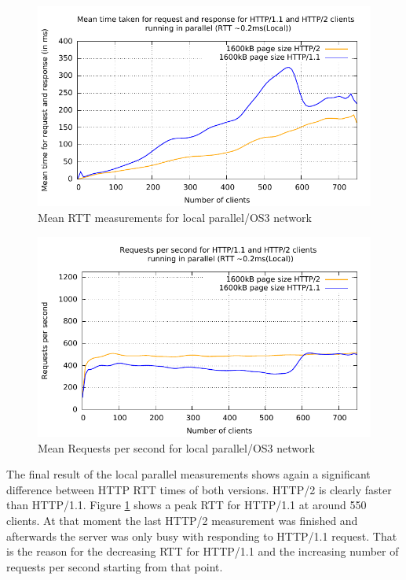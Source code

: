 \begin{figure}[H]
	\centering
	\includegraphics[scale=1,trim=0.0cm .0cm .0cm .0cm,clip]{images/latency-localv1vsv2.pdf}
	\caption{Mean RTT measurements for local parallel/OS3 network}
	\label{fig:latency-localv1vsv2}
\end{figure}

\begin{figure}[H]
	\centering
	\includegraphics[scale=1,trim=0.0cm .0cm .0cm .0cm,clip]{images/reqps-localv1vsv2.pdf}
	\caption{Mean Requests per second for local parallel/OS3 network}
	\label{fig:reqps-localv1vsv2}
\end{figure}
 
The final result of the local parallel measurements shows again a significant difference between HTTP RTT times of both versions. HTTP/2 is clearly faster than HTTP/1.1. Figure \ref{fig:latency-localv1vsv2} shows a peak RTT for HTTP/1.1 at around 550 clients. At that moment the last HTTP/2 measurement was finished and afterwards the server was only busy with responding to HTTP/1.1 request. That is the reason for the decreasing RTT for HTTP/1.1 and the increasing number of requests per second starting  from that point.

